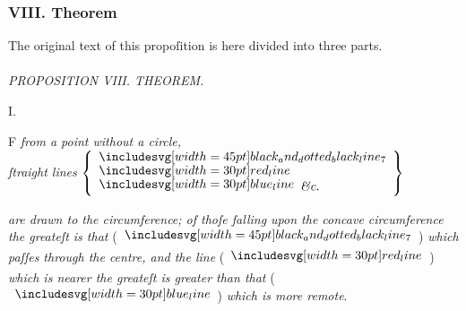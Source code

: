 \documentclass[11pt,preview]{standalone}
\begin{document}
\null\removelastskip\nointerlineskip\vspace*{-\baselineskip}

\subsubsection{VIII. Theorem}

\begin{minipage}[t]{0.54\textwidth}
    \begin{center}
        The original text of this propoſition is here divided into three parts.\\
        \hfill\\
        \textit{PROPOSITION VIII. THEOREM.}\label{book3pr8}
    \end{center}

    \hfill

    \begin{center}
        I.\\
        \raggedright \lettrine[lines=3, loversize=1, nindent=0pt]{}{}F \textit{from a point without a circle,\\ ſtraight lines} $\left\{\begin{aligned}                                                            & \bimg{black_and_dotted_black_line_7} \\[-2ex] & \redline \\[-2ex] & \blueline \textit{\&c.}
            \end{aligned}\right\}$
    \end{center}
    \raggedright \textit{are drawn to the circumference; of thoſe falling upon the concave circumference the greateſt is that} (\hspace{-1ex}$\bimg{black_and_dotted_black_line_7}$\hspace{-1ex}) \textit{which paſſes through the centre, and the line} (\hspace{-1ex}$\redline$\hspace{-1ex}) \textit{which is nearer the greateſt is greater than  that} (\hspace{-1ex}$\blueline$\hspace{-1ex}) \textit{which is more remote}.
\end{minipage}%
\hfill
\begin{minipage}[t]{0.43\textwidth}
    \vspace{55pt}
    
\end{minipage}%
\end{document}
